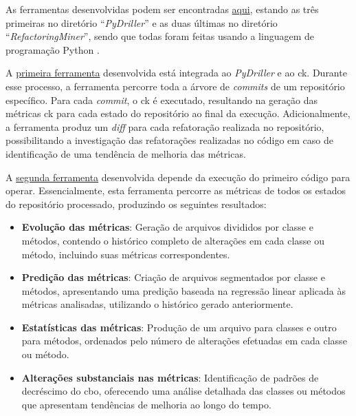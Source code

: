 As ferramentas desenvolvidas podem ser encontradas \href{https://github.com/BrenoFariasdaSilva/Scientific-Research}{aqui}, estando as três primeiras no diretório ``\textit{PyDriller}'' e as duas últimas no diretório ``\textit{RefactoringMiner}'', sendo que todas foram feitas usando a linguagem de programação Python \cite{PythonProgrammingLanguage}.

A \href{https://github.com/BrenoFariasdaSilva/Scientific-Research/blob/main/PyDriller/metrics_changes.py}{primeira ferramenta} desenvolvida está integrada ao \textit{PyDriller} e ao \gls{ck}. Durante esse processo, a ferramenta percorre toda a árvore de \textit{commits} de um repositório específico. Para cada \textit{commit}, o \gls{ck} é executado, resultando na geração das métricas \gls{ck} para cada estado do repositório ao final da execução. Adicionalmente, a ferramenta produz um \textit{diff} para cada refatoração realizada no repositório, possibilitando a investigação das refatorações realizadas no código em caso de identificação de uma tendência de melhoria das métricas.

A \href{https://github.com/BrenoFariasdaSilva/Scientific-Research/blob/main/PyDriller/metrics_changes.py}{segunda ferramenta} desenvolvida depende da execução do primeiro código para operar. Essencialmente, esta ferramenta percorre as métricas de todos os estados do repositório processado, produzindo os seguintes resultados:

\begin{itemize}
    \item \textbf{Evolução das métricas}: Geração de arquivos divididos por classe e métodos, contendo o histórico completo de alterações em cada classe ou método, incluindo suas métricas correspondentes.
    \item \textbf{Predição das métricas}: Criação de arquivos segmentados por classe e métodos, apresentando uma predição baseada na regressão linear aplicada às métricas analisadas, utilizando o histórico gerado anteriormente.
    \item \textbf{Estatísticas das métricas}: Produção de um arquivo para classes e outro para métodos, ordenados pelo número de alterações efetuadas em cada classe ou método.
    \item \textbf{Alterações substanciais nas métricas}: Identificação de padrões de decréscimo do \gls{cbo}, oferecendo uma análise detalhada das classes ou métodos que apresentam tendências de melhoria ao longo do tempo.
\end{itemize}

